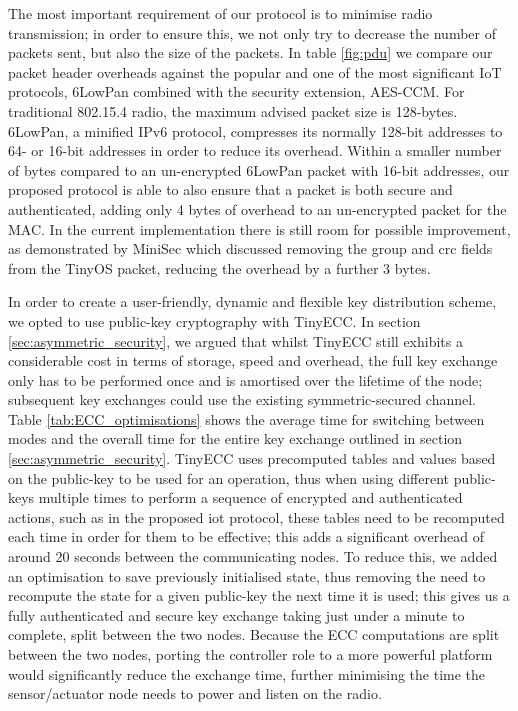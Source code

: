 \documentclass{mpaper}
\begin{document}
The most important requirement of our protocol is to minimise radio transmission; in order to ensure this, we not only try to decrease the number of packets sent, but also the size of the packets. In table \ref{fig:pdu} we compare our packet header overheads against the popular and one of the most significant IoT protocols, 6LowPan combined with the security extension, AES-CCM. For traditional 802.15.4 radio, the maximum advised packet size is 128-bytes. 6LowPan, a minified IPv6 protocol, compresses its normally 128-bit addresses to 64- or 16-bit addresses in order to reduce its overhead. Within a smaller number of bytes compared to an un-encrypted 6LowPan packet with 16-bit addresses, our proposed protocol is able to also ensure that a packet is both secure and authenticated, adding only 4 bytes of overhead to an un-encrypted packet for the MAC. In the current implementation there is still room for possible improvement, as demonstrated by MiniSec which discussed removing the group and crc fields from the TinyOS packet, reducing the overhead by a further 3 bytes.

In order to create a user-friendly, dynamic and flexible key distribution scheme, we opted to use public-key cryptography with TinyECC. In section \ref{sec:asymmetric_security}, we argued that whilst TinyECC still exhibits a considerable cost in terms of storage, speed and overhead, the full key exchange only has to be performed once and is amortised over the lifetime of the node; subsequent key exchanges could use the existing symmetric-secured channel. Table \ref{tab:ECC_optimisations} shows the average time for switching between modes and the overall time for the entire key exchange outlined in section \ref{sec:asymmetric_security}. TinyECC uses precomputed tables and values based on the public-key to be used for an operation, thus when using different public-keys multiple times to perform a sequence of encrypted and authenticated actions, such as in the proposed iot protocol, these tables need to be recomputed each time in order for them to be effective; this adds a significant overhead of around 20 seconds between the communicating nodes. To reduce this, we added an optimisation to save previously initialised state, thus removing the need to recompute the state for a given public-key the next time it is used; this gives us a fully authenticated and secure key exchange taking just under a minute to complete, split between the two nodes. Because the ECC computations are split between the two nodes, porting the controller role to a more powerful platform would significantly reduce the exchange time, further minimising the time the sensor/actuator node needs to power and listen on the radio. 
\end{document}
